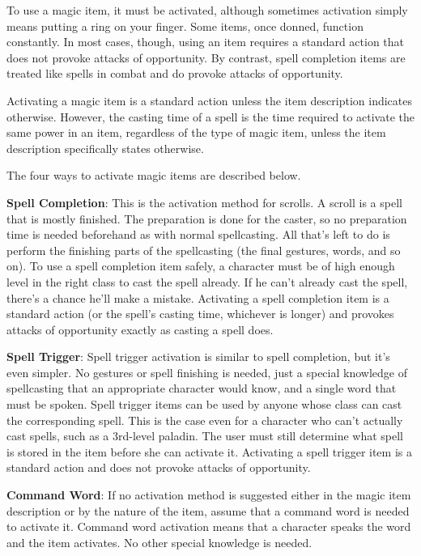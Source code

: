 To use a magic item, it must be activated, although sometimes activation simply means putting a ring on your finger. Some items, once donned, function constantly. In most cases, though, using an item requires a standard action that does not provoke attacks of opportunity. By contrast, spell completion items are treated like spells in combat and do provoke attacks of opportunity.
				
Activating a magic item is a standard action unless the item description indicates otherwise. However, the casting time of a spell is the time required to activate the same power in an item, regardless of the type of magic item, unless the item description specifically states otherwise.
				
The four ways to activate magic items are described below.
				
\textbf{Spell Completion}: This is the activation method for scrolls. A scroll is a spell that is mostly finished. The preparation is done for the caster, so no preparation time is needed beforehand as with normal spellcasting. All that's left to do is perform the finishing parts of the spellcasting (the final gestures, words, and so on). To use a spell completion item safely, a character must be of high enough level in the right class to cast the spell already. If he can't already cast the spell, there's a chance he'll make a mistake. Activating a spell completion item is a standard action (or the spell's casting time, whichever is longer) and provokes attacks of opportunity exactly as casting a spell does.
				
\textbf{Spell Trigger}: Spell trigger activation is similar to spell completion, but it's even simpler. No gestures or spell finishing is needed, just a special knowledge of spellcasting that an appropriate character would know, and a single word that must be spoken. Spell trigger items can be used by anyone whose class can cast the corresponding spell. This is the case even for a character who can't actually cast spells, such as a 3rd-level paladin. The user must still determine what spell is stored in the item before she can activate it. Activating a spell trigger item is a standard action and does not provoke attacks of opportunity.
				
\textbf{Command Word}: If no activation method is suggested either in the magic item description or by the nature of the item, assume that a command word is needed to activate it. Command word activation means that a character speaks the word and the item activates. No other special knowledge is needed.
				
